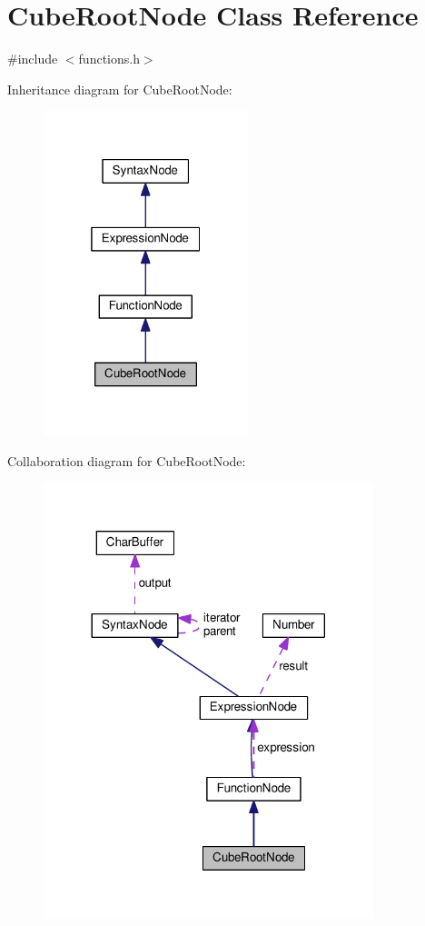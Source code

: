 \hypertarget{classCubeRootNode}{}\section{Cube\+Root\+Node Class Reference}
\label{classCubeRootNode}


{\ttfamily \#include $<$functions.\+h$>$}



Inheritance diagram for Cube\+Root\+Node\+:
\nopagebreak
\begin{figure}[H]
\begin{center}
\leavevmode
\includegraphics[width=169pt]{dc/d0f/classCubeRootNode__inherit__graph}
\end{center}
\end{figure}


Collaboration diagram for Cube\+Root\+Node\+:
\nopagebreak
\begin{figure}[H]
\begin{center}
\leavevmode
\includegraphics[width=272pt]{d0/d6c/classCubeRootNode__coll__graph}
\end{center}
\end{figure}

